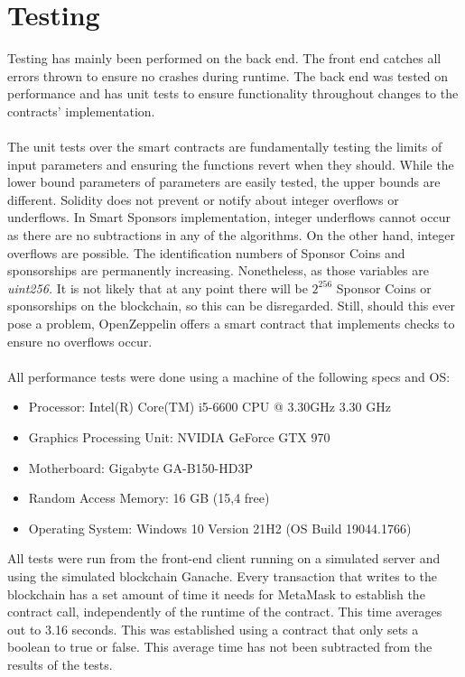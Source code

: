 \section{Testing}
Testing has mainly been performed on the back end. The front end catches all errors thrown to ensure no crashes during runtime. The back end was tested on performance and has unit tests to ensure functionality throughout changes to the contracts' implementation.\\
\\
The unit tests over the smart contracts are fundamentally testing the limits of input parameters and ensuring the functions revert when they should. While the lower bound parameters of parameters are easily tested, the upper bounds are different. Solidity does not prevent or notify about integer overflows or underflows. In Smart Sponsors implementation, integer underflows cannot occur as there are no subtractions in any of the algorithms. On the other hand, integer overflows are possible. The identification numbers of Sponsor Coins and sponsorships are permanently increasing. Nonetheless, as those variables are \emph{uint256.} It is not likely that at any point there will be $2^{256}$ Sponsor Coins or sponsorships on the blockchain, so this can be disregarded. Still, should this ever pose a problem, OpenZeppelin offers a smart contract that implements checks to ensure no overflows occur\cite{Zeppelin}.\\
\\
All performance tests were done using a machine of the following specs and OS:
\begin{itemize}
    \item Processor: Intel(R) Core(TM) i5-6600 CPU @ 3.30GHz   3.30 GHz
    \item Graphics Processing Unit: NVIDIA GeForce GTX 970
    \item Motherboard: Gigabyte GA-B150-HD3P
    \item Random Access Memory: 16 GB (15,4 free)
    \item Operating System: Windows 10 Version 21H2 (OS Build 19044.1766)
\end{itemize}
All tests were run from the front-end client running on a simulated server and using the simulated blockchain Ganache\cite{truffle}. Every transaction that writes to the blockchain has a set amount of time it needs for MetaMask to establish the contract call, independently of the runtime of the contract. This time averages out to 3.16 seconds. This was established using a contract that only sets a boolean to true or false. This average time has not been subtracted from the results of the tests.\\
